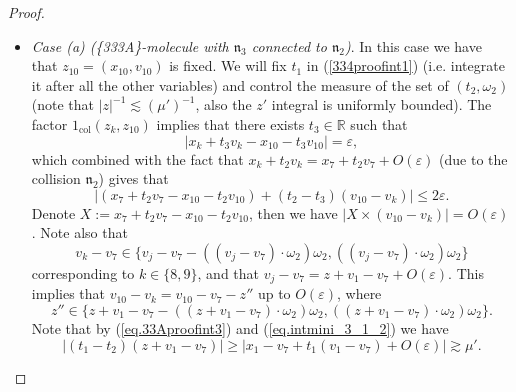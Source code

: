 \documentclass[10pt, reqno]{amsart}
\newcommand{\Rb}{\mathbb R}
\newcommand{\nf}{\mathfrak n}
\theoremstyle{definition}
\theoremstyle{remark}
\numberwithin{equation}{section}
\begin{document}
\begin{proof}
\begin{itemize}
\item \emph{Case (a) (\{333A\}-molecule with $\nf_3$ connected to $\nf_2$)}. In this case we have that $z_{10}=(x_{10},v_{10})$ is fixed. We will fix $t_1$ in (\ref{334proofint1}) (i.e. integrate it after all the other variables) and control the measure of the set of $(t_2,\omega_2)$ (note that $|z|^{-1}\lesssim(\mu')^{-1}$, also the $z'$ integral is uniformly bounded). The factor $1_{\mathrm{col}}(z_k, z_{10})$ implies that there exists $t_3\in\Rb$ such that
\begin{equation}\label{coll3conc}
|x_k+t_3 v_k -x_{10}-t_3 v_{10}|=\varepsilon,
\end{equation}
which combined with the fact that $x_k+t_2v_k=x_7+t_2v_7+ O(\varepsilon)$ (due to the collision $\nf_2$)
gives that 
\begin{equation}\label{v3v5cross}
|(x_7+t_2 v_7-x_{10}-t_2v_{10})+(t_2-t_3)(v_{10}-v_k)|\leq 2\varepsilon. 
\end{equation}
Denote $X:=x_7+t_2 v_7-x_{10}-t_2v_{10}$, then we have $|X\times (v_{10}-v_k)|=O(\varepsilon)$. Note also that \[v_k-v_7\in\{v_j-v_7-((v_j-v_7)\cdot\omega_2)\omega_2,((v_j-v_7)\cdot\omega_2)\omega_2\}\] corresponding to $k\in\{8,9\}$, and that $v_j-v_7=z+v_1-v_7+O(\varepsilon)$. This implies that $v_{10}-v_k=v_{10}-v_7-z''$ up to $O(\varepsilon)$, where
\begin{equation}\label{eq.whatever}z''\in\{z+v_1-v_7-((z+v_1-v_7)\cdot\omega_2)\omega_2,((z+v_1-v_7)\cdot\omega_2)\omega_2\}.\end{equation} Note that by (\ref{eq.33Aproofint3}) and (\ref{eq.intmini_3_1_2}) we have \[|(t_1-t_2)(z+v_1-v_7)|\geq |x_1-v_7+t_1(v_1-v_7)+O(\varepsilon)|\gtrsim\mu'.\]


\end{itemize}
\end{proof}
\end{document}
